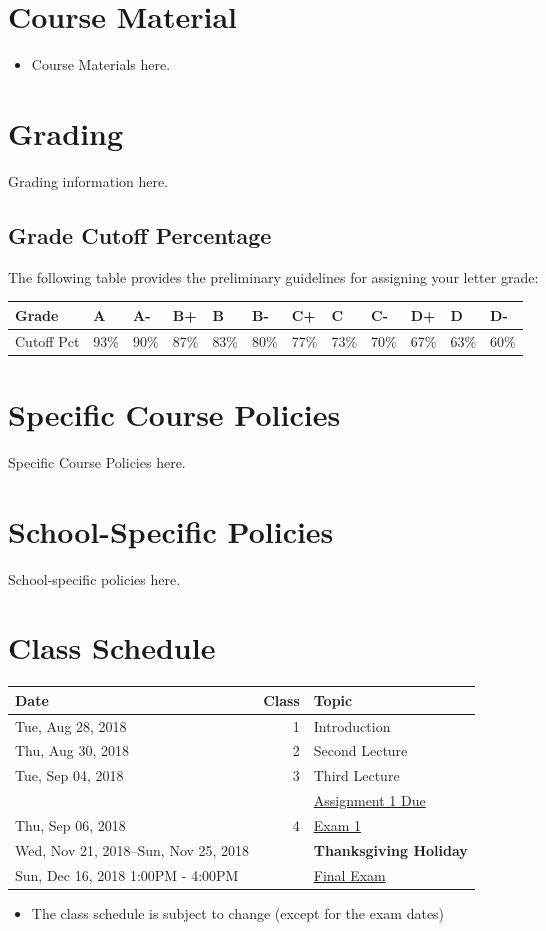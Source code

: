 \documentclass[article,letterpaper,times,10pt,listings-bw,microtype]{scrartcl}
\begin{document}
\section*{Course Material}
\label{sec:org1858e2f}
\begin{itemize}
\item Course Materials here.
\end{itemize}
\section*{Grading}
\label{sec:org2195b5d}
Grading information here.
\subsection*{Grade Cutoff Percentage}
\label{sec:org9788cad}
The following table provides the preliminary guidelines for assigning your
letter grade:

\begin{center}
\begin{tabular}{llllllllllll}
\hline
Grade & A & A- & B+ & B & B- & C+ & C & C- & D+ & D & D-\\
\hline
Cutoff Pct & 93\% & 90\% & 87\% & 83\% & 80\% & 77\% & 73\% & 70\% & 67\% & 63\% & 60\%\\
\hline
\end{tabular}
\end{center}
\section*{Specific Course Policies}
\label{sec:orga1a71ad}
Specific Course Policies here.
\section*{School-Specific Policies}
\label{sec:orge295f9e}
School-specific policies here.
\clearpage
\section*{Class Schedule}
\label{sec:org1e71c80}
\begin{center}
\begin{tabular}{lrl}
Date & Class & Topic\\
\hline
Tue, Aug 28, 2018 & 1 & Introduction\\
Thu, Aug 30, 2018 & 2 & Second Lecture\\
Tue, Sep 04, 2018 & 3 & Third Lecture\\
 &  & \uline{Assignment 1 Due}\\
Thu, Sep 06, 2018 & 4 & \uline{Exam 1}\\
Wed, Nov 21, 2018--Sun, Nov 25, 2018 &  & \textbf{Thanksgiving Holiday}\\
Sun, Dec 16, 2018  1:00PM - 4:00PM &  & \uline{Final Exam}\\
\end{tabular}
\end{center}

\begin{mdframed}[style=exampledefault, frametitle={Disclaimer}]
\begin{itemize}
\item The class schedule is subject to change (except for the exam dates)
\end{itemize}
\end{mdframed}
\end{document}
